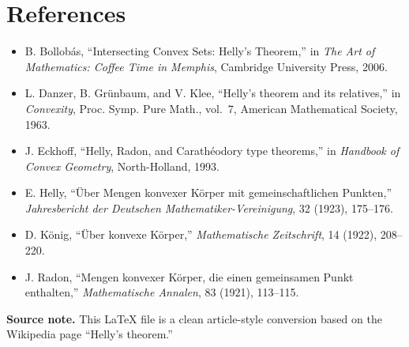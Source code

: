 \documentclass[11pt]{article}
\begin{document}
\section*{References}

\begin{itemize}
    \item B. Bollob\'as, ``Intersecting Convex Sets: Helly's Theorem,'' in \emph{The Art of Mathematics: Coffee Time in Memphis}, Cambridge University Press, 2006.
    \item L. Danzer, B. Gr\"unbaum, and V. Klee, ``Helly's theorem and its relatives,'' in \emph{Convexity}, Proc. Symp. Pure Math., vol.~7, American Mathematical Society, 1963.
    \item J. Eckhoff, ``Helly, Radon, and Carath\'eodory type theorems,'' in \emph{Handbook of Convex Geometry}, North-Holland, 1993.
    \item E. Helly, ``\"Uber Mengen konvexer K\"orper mit gemeinschaftlichen Punkten,'' \emph{Jahresbericht der Deutschen Mathematiker-Vereinigung}, 32 (1923), 175--176.
    \item D. K\"onig, ``\"Uber konvexe K\"orper,'' \emph{Mathematische Zeitschrift}, 14 (1922), 208--220.
    \item J. Radon, ``Mengen konvexer K\"orper, die einen gemeinsamen Punkt enthalten,'' \emph{Mathematische Annalen}, 83 (1921), 113--115.
\end{itemize}

\bigskip
\noindent\textbf{Source note.} This \LaTeX{} file is a clean article-style conversion based on the Wikipedia page ``Helly's theorem.''
\end{document}
